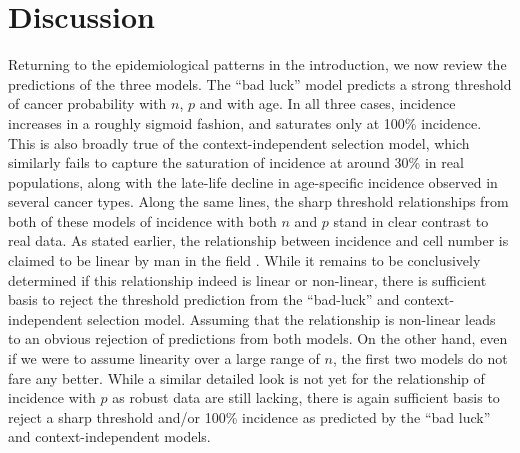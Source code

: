 \documentclass[9pt,twocolumn,twoside]{pnas-new}
\begin{document}
\section*{Discussion}
Returning to the epidemiological patterns in the introduction, we now review the predictions of the three models. The ``bad luck'' model predicts a strong threshold of cancer probability with $n$, $p$ and with age. In all three cases, incidence increases in a roughly sigmoid fashion, and saturates only at 100\% incidence. This is also broadly true of the context-independent selection model, which similarly fails to capture the saturation of incidence at around 30\% in real populations, along with the late-life decline in age-specific incidence observed in several cancer types. Along the same lines, the sharp threshold relationships from both of these models of incidence with both $n$ and $p$ stand in clear contrast to real data. As stated earlier, the relationship between incidence and cell number is claimed to be linear by man in the field \cite{Tomasetti78, Tomasetti2017}. While it remains to be conclusively determined if this relationship indeed is linear or non-linear, there is sufficient basis to reject the threshold prediction from the ``bad-luck'' and context-independent selection model. Assuming that the relationship is non-linear leads to an obvious rejection of predictions from both models. On the other hand, even if we were to assume linearity over a large range of $n$, the first two models do not fare any better. While a similar detailed look is not yet for the relationship of incidence with $p$ as robust data are still lacking, there is again sufficient basis to reject a sharp threshold and/or 100\% incidence as predicted by the ``bad luck'' and context-independent models.
\end{document}
